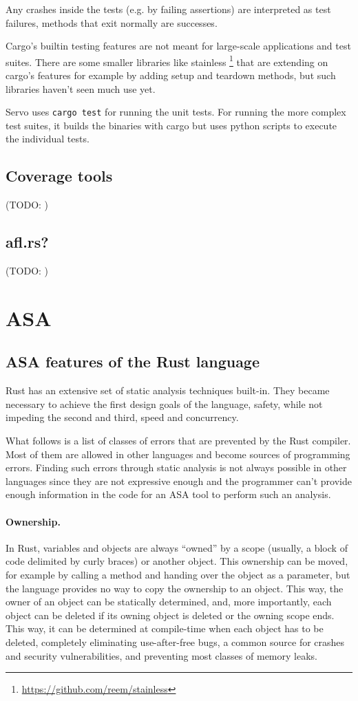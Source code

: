 \documentclass{scrartcl}
\newcommand{\todo}[1] {{\color{red}(TODO: #1)}}
\begin{document}
Any crashes inside the tests (e.g. by failing assertions) are interpreted as test failures, methods that exit normally are successes.

Cargo's builtin testing features are not meant for large-scale applications and test suites. There are some smaller libraries like stainless \footnote{\url{https://github.com/reem/stainless}} that are extending on cargo's features for example by adding setup and teardown methods, but such libraries haven't seen much use yet. 

Servo uses \texttt{cargo test} for running the unit tests. For running the more complex test suites, it builds the binaries with cargo but uses python scripts to execute the individual tests.


\subsection{Coverage tools}
\todo{}

\subsection{afl.rs?}
\todo{}


\section{ASA}

\subsection{ASA features of the Rust language} \label{rust_features}

Rust has an extensive set of static analysis techniques built-in. They became necessary to achieve the first design goals of the language, safety, while not impeding the second and third, speed and concurrency.

What follows is a list of classes of errors that are prevented by the Rust compiler. Most of them are allowed in other languages and become sources of programming errors. Finding such errors through static analysis is not always possible in other languages since they are not expressive enough and the programmer can't provide enough information in the code for an ASA tool to perform such an analysis.

\paragraph{Ownership.} In Rust, variables and objects are always "`owned"' by a scope (usually, a block of code delimited by curly braces) or another object. This ownership can be moved, for example by calling a method and handing over the object as a parameter, but the language provides no way to copy the ownership to an object. This way, the owner of an object can be statically determined, and, more importantly, each object can be deleted if its owning object is deleted or the owning scope ends. This way, it can be determined at compile-time when each object has to be deleted, completely eliminating use-after-free bugs, a common source for crashes and security vulnerabilities, and preventing most classes of memory leaks.
\end{document}
